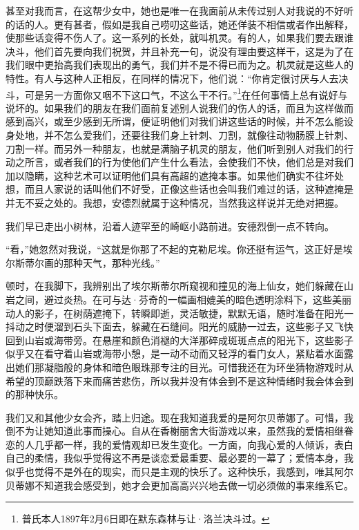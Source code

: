 \par 甚至对我而言，在这帮少女中，她也是唯一在我面前从未传过别人对我说的不好听的话的人。更有甚者，假如是我自己唠叨这些话，她还佯装不相信或者作出解释，使那些话变得不伤人了。这一系列的长处，就叫机灵。有的人，如果我们要去跟谁决斗，他们首先要向我们祝贺，并且补充一句，说没有理由要这样干，这是为了在我们眼中更抬高我们表现出的勇气，我们并不是不得已而为之。机灵就是这些人的特性。有人与这种人正相反，在同样的情况下，他们说：“你肯定很讨厌与人去决斗，可是另一方面你又咽不下这口气，不这么干不行。”\footnote{普氏本人1897年2月6日即在默东森林与让·洛兰决斗过。}在任何事情上总有说好与说坏的。如果我们的朋友在我们面前复述别人说我们的伤人的话，而且为这样做而感到高兴，或至少感到无所谓，便证明他们对我们讲这些话的时候，并不怎么能设身处地，并不怎么爱我们，还要往我们身上针刺、刀割，就像往动物肠膜上针刺、刀割一样。而另外一种朋友，也就是满脑子机灵的朋友，他们听到别人对我们的行动之所言，或者我们的行为使他们产生什么看法，会使我们不快，他们总是对我们加以隐瞒，这种艺术可以证明他们具有高超的遮掩本事。如果他们确实不往坏处想，而且人家说的话叫他们不好受，正像这些话也会叫我们难过的话，这种遮掩是并无不妥之处的。我想，安德烈就属于这种情况，当然我这样说并无绝对把握。
\par 我们早已走出小树林，沿着人迹罕至的崎岖小路前进。安德烈倒一点不转向。
\par “看，”她忽然对我说，“这就是你那了不起的克勒尼埃。你还挺有运气，这正好是埃尔斯蒂尔画的那种天气，那种光线。”
\par 顿时，在我脚下，我辨别出了埃尔斯蒂尔所窥视和撞见的海上仙女，她们躲藏在山岩之间，避过炎热。在可与达·芬奇的一幅画相媲美的暗色透明涂料下，这些美丽动人的影子，在树荫遮掩下，转瞬即逝，灵活敏捷，默默无语，随时准备在阳光一抖动之时便溜到石头下面去，躲藏在石缝间。阳光的威胁一过去，这些影子又飞快回到山岩或海带旁。在悬崖和颜色消褪的大洋那碎成斑斑点点的阳光下，这些影子似乎又在看守着山岩或海带小憩，是一动不动而又轻浮的看门女人，紧贴着水面露出她们那凝脂般的身体和暗色眼珠那专注的目光。可惜我还在为环坐猜物游戏时从希望的顶巅跌落下来而痛苦悲伤，所以我并没有体会到不是这种情绪时我会体会到的那种快乐。
\par 我们又和其他少女会齐，踏上归途。现在我知道我爱的是阿尔贝蒂娜了。可惜，我倒不为让她知道此事而操心。自从在香榭丽舍大街游戏以来，虽然我的爱情相继眷恋的人几乎都一样，我的爱情观却已发生变化。一方面，向我心爱的人倾诉，表白自己的柔情，我似乎觉得这不再是谈恋爱最重要、最必要的一幕了；爱情本身，我似乎也觉得不是外在的现实，而只是主观的快乐了。这种快乐，我感到，唯其阿尔贝蒂娜不知道我会感受到，她才会更加高高兴兴地去做一切必须做的事来维系它。

